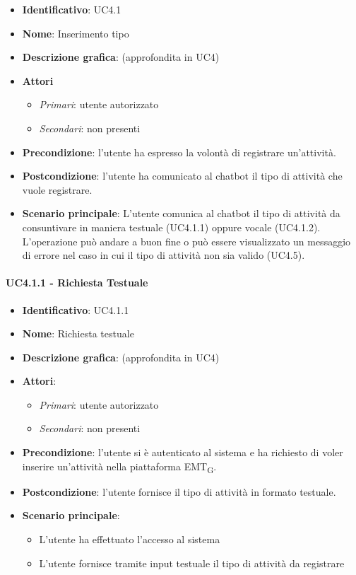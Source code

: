 \begin{itemize}
    \item \textbf{Identificativo}: UC4.1 
    \item \textbf{Nome}: Inserimento tipo  
    \item \textbf{Descrizione grafica}: (approfondita in UC4)
    \item \textbf{Attori}
        \begin{itemize} 
            \item \textit{Primari}: utente autorizzato
            \item \textit{Secondari}: non presenti
        \end{itemize}
    \item \textbf{Precondizione}: l'utente ha espresso la volontà di registrare un'attività. 
    \item \textbf{Postcondizione}: l'utente ha comunicato al chatbot il tipo di attività che vuole registrare. 
    \item \textbf{Scenario principale}: L'utente comunica al chatbot il tipo di attività da consuntivare in maniera testuale (UC4.1.1) oppure vocale (UC4.1.2). L'operazione può andare a buon fine o può essere visualizzato un messaggio di errore nel caso in cui il tipo di attività non sia valido (UC4.5).
\end{itemize}

\paragraph{UC4.1.1 - Richiesta Testuale}
\begin{itemize}
   \item \textbf{Identificativo}: UC4.1.1
   \item \textbf{Nome}: Richiesta testuale
   \item \textbf{Descrizione grafica}: (approfondita in UC4)
   \item \textbf{Attori}:
   \begin{itemize} 
       \item \textit{Primari}: utente autorizzato
       \item \textit{Secondari}: non presenti
   \end{itemize}
       \item \textbf{Precondizione}: l'utente si è autenticato al sistema e ha richiesto di voler inserire un'attività nella piattaforma EMT\textsubscript{G}. 
       \item \textbf{Postcondizione}: l'utente fornisce il tipo di attività in formato testuale. 
    \item \textbf{Scenario principale}: 
       \begin{itemize}
           \item L'utente ha effettuato l'accesso al sistema 
           \item L'utente fornisce tramite input testuale il tipo di attività da  registrare
       \end{itemize}
\end{itemize}

